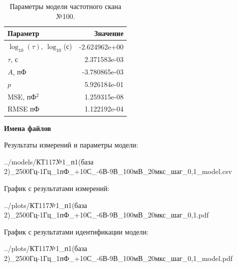 \begin{table}[!ht]
    \centering
    \caption{Параметры модели частотного скана №100.}
    \begin{tabular}{|l|r|}
        \hline
        Параметр                                       & Значение                  \\ \hline
        $\log_{10}(\tau)$, $\log_{10}$(с)              & -2.624962e+00             \\ \hline
        $\tau$, с                                      & 2.371583e-03              \\ \hline
        $A$, пФ                                        & -3.780865e-03             \\ \hline
        $p$                                            & 5.926184e-01              \\ \hline
        MSE, пФ$^2$                                    & 1.259315e-08              \\ \hline
        RMSE пФ                                        & 1.122192e-04              \\ \hline
    \end{tabular}
    \label{table:frequency_scan_model_100}
\end{table}

\textbf{Имена файлов}

Результаты измерений и параметры модели:

\scriptsize../models/КТ117№1\_п1(база 2)\_2500Гц-1Гц\_1пФ\_+10С\_-6В-9В\_100мВ\_20мкс\_шаг\_0,1\_model.csv
\normalsize

График с результатами измерений:

\scriptsize../plots/КТ117№1\_п1(база 2)\_2500Гц-1Гц\_1пФ\_+10С\_-6В-9В\_100мВ\_20мкс\_шаг\_0,1.pdf
\normalsize

График с результатами идентификации модели:

\scriptsize../plots/КТ117№1\_п1(база 2)\_2500Гц-1Гц\_1пФ\_+10С\_-6В-9В\_100мВ\_20мкс\_шаг\_0,1\_model.pdf
\normalsize

